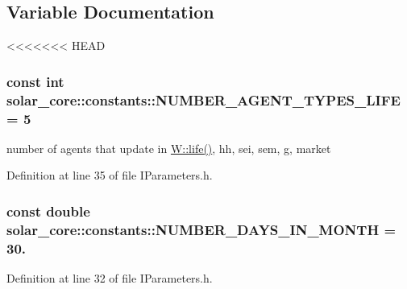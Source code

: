 \subsection{Variable Documentation}
\hypertarget{namespacesolar__core_1_1constants_a2ec52da705235aa418b0def4e509ef81}{}
<<<<<<< HEAD
\subsubsection[{N\+U\+M\+B\+E\+R\+\_\+\+A\+G\+E\+N\+T\+\_\+\+T\+Y\+P\+E\+S\+\_\+\+L\+I\+F\+E}]{\setlength{\rightskip}{0pt plus 5cm}const int solar\+\_\+core\+::constants\+::\+N\+U\+M\+B\+E\+R\+\_\+\+A\+G\+E\+N\+T\+\_\+\+T\+Y\+P\+E\+S\+\_\+\+L\+I\+F\+E = 5}\label{namespacesolar__core_1_1constants_a2ec52da705235aa418b0def4e509ef81}
number of agents that update in \hyperlink{classsolar__core_1_1_w_a5e64e5a7ef41c07fddf7994cd3f2693e}{W\+::life()}, hh, sei, sem, g, market 

Definition at line 35 of file I\+Parameters.\+h.

\hypertarget{namespacesolar__core_1_1constants_ad1ba09888c65cd255ec5e71f9121b1ed}{}
\subsubsection[{N\+U\+M\+B\+E\+R\+\_\+\+D\+A\+Y\+S\+\_\+\+I\+N\+\_\+\+M\+O\+N\+T\+H}]{\setlength{\rightskip}{0pt plus 5cm}const double solar\+\_\+core\+::constants\+::\+N\+U\+M\+B\+E\+R\+\_\+\+D\+A\+Y\+S\+\_\+\+I\+N\+\_\+\+M\+O\+N\+T\+H = 30.}\label{namespacesolar__core_1_1constants_ad1ba09888c65cd255ec5e71f9121b1ed}


Definition at line 32 of file I\+Parameters.\+h.


